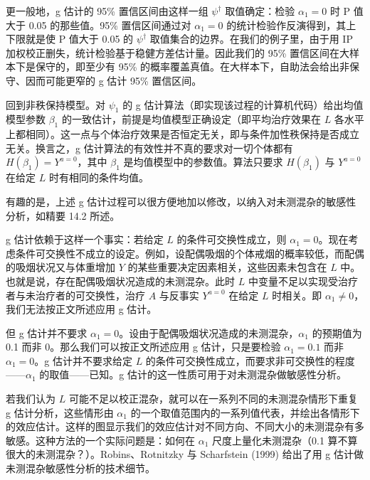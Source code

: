 
更一般地，g 估计的 95\% 置信区间由这样一组 $\psi^\dagger$ 取值确定：检验 $\alpha_1=0$ 时 P 值大于 0.05 的那些值。95\% 置信区间通过对 $\alpha_1=0$ 的统计检验作反演得到，其上下限就是使 P 值大于 0.05 的 $\psi^\dagger$ 取值集合的边界。在我们的例子里，由于用 IP 加权校正删失，统计检验基于稳健方差估计量。因此我们的 95\% 置信区间在大样本下是保守的，即至少有 95\% 的概率覆盖真值。在大样本下，自助法会给出非保守、因而可能更窄的 g 估计 95\% 置信区间。


回到非秩保持模型。对 $\psi_1$ 的 g 估计算法（即实现该过程的计算机代码）给出均值模型参数 $\beta_1$ 的一致估计，前提是均值模型正确设定（即平均治疗效果在 $L$ 各水平上都相同）。这一点与个体治疗效果是否恒定无关，即与条件加性秩保持是否成立无关。换言之，g 估计算法的有效性并不真的要求对一切个体都有 $H(\beta_1)=Y^{a=0}$，其中 $\beta_1$ 是均值模型中的参数值。算法只要求 $H(\beta_1)$ 与 $Y^{a=0}$ 在给定 $L$ 时有相同的条件均值。

有趣的是，上述 g 估计过程可以很方便地加以修改，以纳入对未测混杂的敏感性分析，如精要 14.2 所述。

\begin{finepoint}[未测混杂的敏感性分析]
g 估计依赖于这样一个事实：若给定 $L$ 的条件可交换性成立，则 $\alpha_1=0$。现在考虑条件可交换性不成立的设定。例如，设配偶吸烟的个体戒烟的概率较低，而配偶的吸烟状况又与体重增加 $Y$ 的某些重要决定因素相关，这些因素未包含在 $L$ 中。也就是说，存在配偶吸烟状况造成的未测混杂。此时 $L$ 中变量不足以实现受治疗者与未治疗者的可交换性，治疗 $A$ 与反事实 $Y^{a=0}$ 在给定 $L$ 时相关。即 $\alpha_1\neq0$，我们无法按正文所述应用 g 估计。

但 g 估计并不要求 $\alpha_1=0$。设由于配偶吸烟状况造成的未测混杂，$\alpha_1$ 的预期值为 0.1 而非 0。那么我们可以按正文所述应用 g 估计，只是要检验 $\alpha_1=0.1$ 而非 $\alpha_1=0$。g 估计并不要求给定 $L$ 的条件可交换性成立，而要求非可交换性的程度——$\alpha_1$ 的取值——已知。g 估计的这一性质可用于对未测混杂做敏感性分析。

若我们认为 $L$ 可能不足以校正混杂，就可以在一系列不同的未测混杂情形下重复 g 估计分析，这些情形由 $\alpha_1$ 的一个取值范围内的一系列值代表，并绘出各情形下的效应估计。这样的图显示我们的效应估计对不同方向、不同大小的未测混杂有多敏感。这种方法的一个实际问题是：如何在 $\alpha_1$ 尺度上量化未测混杂（0.1 算不算很大的未测混杂？）。Robins、Rotnitzky 与 Scharfstein (1999) 给出了用 g 估计做未测混杂敏感性分析的技术细节。
\end{finepoint}

